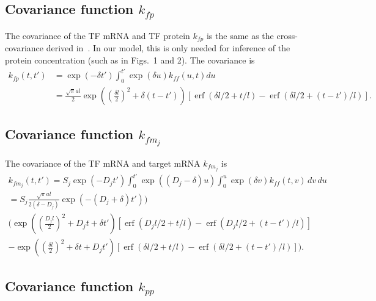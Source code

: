 \documentclass{article}
\newcommand{\erf}{\operatorname{erf}}
\begin{document}
\subsection{Covariance function $k_{fp}$}

The covariance of the TF mRNA and TF protein $k_{fp}$ is the same
as the cross-covariance derived
in~\cite{Lawrence2007}.  In our model, this is only needed for
inference of the protein concentration (such as in Figs.~1 and 2).
The covariance is
\begin{equation}
  \begin{split}
    k_{fp}(t, t') &= \exp(-\delta t') \int_0^{t'} \exp(\delta u) k_{ff}(u, t) du \\
    &= \frac{\sqrt{\pi}al}{2} \exp\left(\left(\frac{\delta l}{2}\right)^2 + \delta (t - t') \right)
    [\erf(\delta l / 2 + t/l) - \erf(\delta l / 2 + (t-t')/l)].
  \end{split}
\end{equation}

\subsection{Covariance function $k_{fm_j}$}

The covariance of the TF mRNA and target mRNA $k_{fm_j}$ is
\begin{multline}
  k_{f m_j}(t, t') = S_j \exp(-D_j t') \int_0^{t'}
  \exp((D_j - \delta) u) \int_0^u \exp(\delta v) k_{ff}(t, v)\, dv\, du \\
  = S_j \frac{\sqrt{\pi} al}{2(\delta - D_j)} \exp(-(D_j+\delta) t')) \\
  \bigg(
  \exp\left(\left(\frac{D_j l}{2}\right)^2 + D_j t + \delta t' \right)
  [\erf(D_j l / 2 + t/l) - \erf(D_j l / 2 + (t-t')/l)] \\
  -
  \exp\left(\left(\frac{\delta l}{2}\right)^2 + \delta t + D_j t'\right)
  [\erf(\delta l / 2 + t/l) - \erf(\delta l / 2 + (t-t')/l)]
  \bigg).
\end{multline}

\subsection{Covariance function $k_{pp}$}
\end{document}
